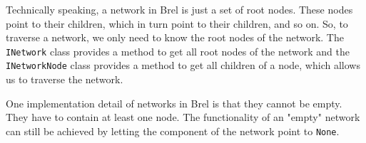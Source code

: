 Technically speaking, a network in Brel is just a set of root nodes.
These nodes point to their children, which in turn point to their children, and so on.
So, to traverse a network, we only need to know the root nodes of the network.
The \texttt{INetwork} class provides a method to get all root nodes of the network
and the \texttt{INetworkNode} class provides a method to get all children of a node,
which allows us to traverse the network.

One implementation detail of networks in Brel is that they cannot be empty.
They have to contain at least one node.
The functionality of an "empty" network can still be achieved by letting the component of the network point to \texttt{None}.






